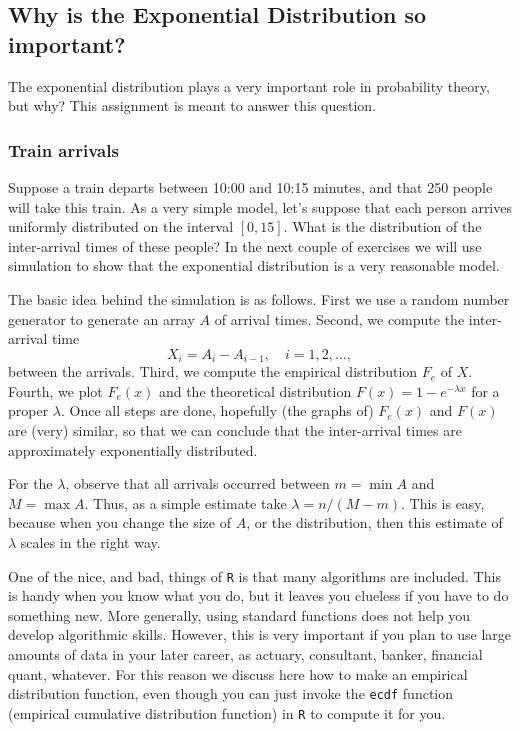 \documentclass[a4paper]{article}
\begin{document}
\subsection{Why is the Exponential Distribution so important?}
\label{sec:org50b29b7}

The exponential distribution plays a very important role in probability theory, but why? This assignment is meant to answer this question.  

\subsubsection{Train arrivals}
\label{sec:org25e266e}

Suppose a train departs between 10:00 and 10:15 minutes, and that 250 people will take this train.
As a very simple model, let's suppose that each person arrives uniformly distributed on the interval \([0,15]\).
What is the distribution of the inter-arrival times of these people?
In the next couple of exercises we will use simulation to show that the exponential distribution is a very reasonable model.

The basic idea behind the simulation is as follows. First we use a random number generator to generate an array \(A\) of arrival times. Second, we compute the inter-arrival time
\begin{equation}
\label{eq:1}
X_{i} = A_{i} - A_{i-1},\quad i = 1,2, \ldots,
\end{equation}
between the arrivals.
Third, we compute the empirical distribution \(F_{e}\) of \(X\).
Fourth, we plot  \(F_{e}(x)\) and  the theoretical distribution \(F(x) = 1-e^{-\lambda x}\) for a proper \(\lambda\). 
Once all steps are done, hopefully (the graphs of) \(F_{e}(x)\) and \(F(x)\) are (very) similar, so that we can conclude that the inter-arrival times are approximately exponentially distributed. 

For the \(\lambda\), observe that all arrivals occurred between \(m= \min A\) and \(M=\max A\). Thus, as a simple estimate take \(\lambda = n/(M-m)\). This is easy, because when you change the size of \(A\), or the distribution, then this estimate of \(\lambda\) scales in the right way.


One of the nice, and bad, things of \texttt{R} is that many algorithms are included.
This is handy when you know what you do, but it leaves you clueless  if you have to do something new.
More generally, using standard functions does not help you develop algorithmic skills.
However, this is very important if you plan to use large amounts of data in your later career, as actuary, consultant, banker, financial quant, whatever.
For this reason we discuss here how to make an empirical distribution function, even though you can just invoke the \texttt{ecdf} function (empirical cumulative distribution function) in \texttt{R} to compute it for you.
\end{document}
